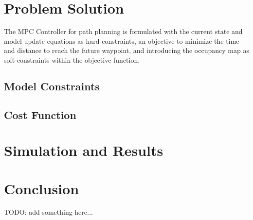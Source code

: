 \documentclass[]{IEEEtran}
\begin{document}





\section{Problem Solution}
\label{sec:pblm_soln}
The MPC Controller for path planning is formulated with the current state and model update equations as hard constraints, an objective to minimize the time and distance to reach the future waypoint, and introducing the occupancy map as soft-constraints within the objective function.

\subsection{Model Constraints}



\subsection{Cost Function}











\section{Simulation and Results}
\label{sec:sim_and_results}












\section{Conclusion}
TODO:
add something here...

\cite{MPC_PathTracking} %



{} 

\end{document}
